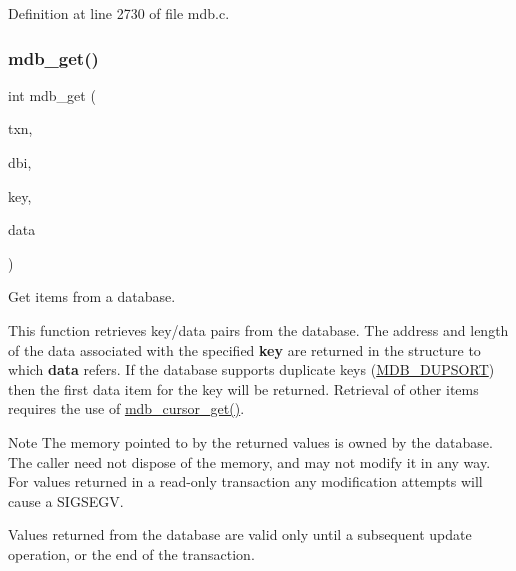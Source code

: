 Definition at line 2730 of file mdb.\+c.

\mbox{\label{group__internal_ga8bf10cd91d3f3a83a34d04ce6b07992d}} 
\subsubsection{\texorpdfstring{mdb\+\_\+get()}{mdb\_get()}}
{\footnotesize\ttfamily int mdb\+\_\+get (\begin{DoxyParamCaption}\item[{\mbox{\hyperlink{struct_m_d_b__txn}{M\+D\+B\+\_\+txn}} $\ast$}]{txn,  }\item[{\mbox{\hyperlink{group__mdb_gadbe68a06c448dfb62da16443d251a78b}{M\+D\+B\+\_\+dbi}}}]{dbi,  }\item[{\mbox{\hyperlink{struct_m_d_b__val}{M\+D\+B\+\_\+val}} $\ast$}]{key,  }\item[{\mbox{\hyperlink{struct_m_d_b__val}{M\+D\+B\+\_\+val}} $\ast$}]{data }\end{DoxyParamCaption})}



Get items from a database. 

This function retrieves key/data pairs from the database. The address and length of the data associated with the specified {\bfseries key} are returned in the structure to which {\bfseries data} refers. If the database supports duplicate keys (\mbox{\hyperlink{group__mdb__dbi__open_gae0626566c2562e9007f5c8c9535bab1a}{M\+D\+B\+\_\+\+D\+U\+P\+S\+O\+RT}}) then the first data item for the key will be returned. Retrieval of other items requires the use of \mbox{\hyperlink{group__mdb_ga48df35fb102536b32dfbb801a47b4cb0}{mdb\+\_\+cursor\+\_\+get()}}.

\begin{DoxyNote}{Note}
The memory pointed to by the returned values is owned by the database. The caller need not dispose of the memory, and may not modify it in any way. For values returned in a read-\/only transaction any modification attempts will cause a S\+I\+G\+S\+E\+GV. 

Values returned from the database are valid only until a subsequent update operation, or the end of the transaction. 
\end{DoxyNote}

